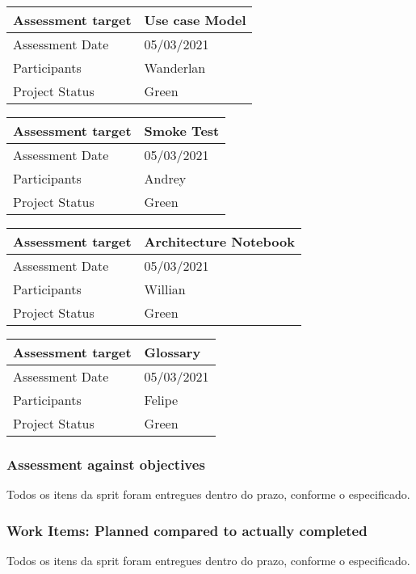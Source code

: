 \noindent\begin{tabular}{|l|l|}
\hline
Assessment target & Use case Model\\\hline
Assessment Date & 05/03/2021\\\hline
Participants & Wanderlan \\\hline
Project Status & Green\\\hline
\end{tabular}

\noindent\begin{tabular}{|l|l|}
\hline
Assessment target & Smoke Test\\\hline
Assessment Date & 05/03/2021\\\hline
Participants & Andrey \\\hline
Project Status & Green\\\hline
\end{tabular}

\noindent\begin{tabular}{|l|l|}
\hline
Assessment target & Architecture Notebook\\\hline
Assessment Date & 05/03/2021\\\hline
Participants & Willian \\\hline
Project Status & Green\\\hline
\end{tabular}

\noindent\begin{tabular}{|l|l|}
\hline
Assessment target & Glossary\\\hline
Assessment Date & 05/03/2021\\\hline
Participants & Felipe \\\hline
Project Status & Green\\\hline
\end{tabular}

\subsubsection*{Assessment against objectives}
Todos os itens da sprit foram entregues dentro do prazo, conforme o especificado. 

\subsubsection*{Work Items: Planned compared to actually completed}
Todos os itens da sprit foram entregues dentro do prazo, conforme o especificado. 

